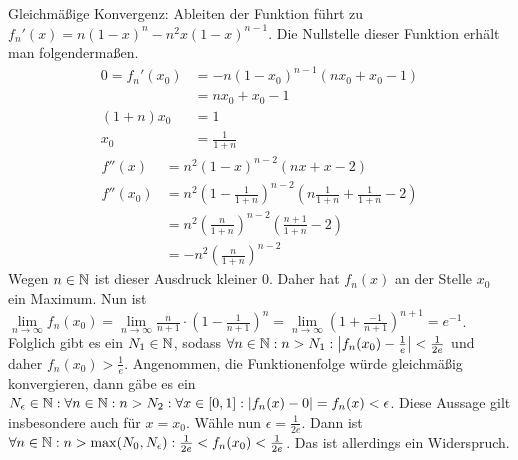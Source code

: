 \documentclass{article}
\begin{document}
\begin{enumerate}[(a)]
\begin{itemize}
            Gleichmäßige Konvergenz: Ableiten der Funktion führt zu $f_n'(x) = n(1-x)^n - n^2 x (1-x)^{n-1}$. Die Nullstelle dieser Funktion erhält man folgendermaßen.
            \begin{align*}
                0 = f_n'(x_0) &= -n(1-x_0)^{n-1}(nx_0 + x_0-1)\\
                &= nx_0 + x_0-1\\
                (1+n) x_0 &= 1\\
                x_0 &= \frac{1}{1+n}
            \end{align*}
            \begin{align*}
                f''(x) &= n^2 (1 - x)^{n - 2} (n x + x - 2)\\
                f''(x_0) &= n^2 (1 - \frac{1}{1+n})^{n - 2} (n \frac{1}{1+n} + \frac{1}{1+n} - 2)\\
                &= n^2 (\frac{n}{1+n})^{n - 2} ( \frac{n+1}{1+n}- 2)\\
                &= - n^2 (\frac{n}{1+n})^{n - 2}
            \end{align*}
            Wegen $n \in \mathbb{N}$ ist dieser Ausdruck kleiner 0. Daher hat $f_n(x)$ an der Stelle $x_0$ ein Maximum.
            Nun ist $\lim\limits_{n\to\infty}f_n(x_0) = \lim\limits_{n\to\infty} \frac{n}{n+1}\cdot \left(1 - \frac{1}{n+1}\right)^n = \lim\limits_{n\to\infty} \left(1 + \frac{-1}{n+1}\right)^{n+1} = e^{-1}$. Folglich gibt es ein $N_1 \in \mathbb{N}$, sodass $\forall n\in \mathbb{N}: n > N_1: \left|f_n(x_0) - \frac{1}{e}\right| < \frac{1}{2e}$ und daher $f_n(x_0) > \frac{1}{e}$. Angenommen, die Funktionenfolge würde gleichmäßig konvergieren, dann gäbe es ein $N_\epsilon \in \mathbb{N}: \forall n \in \mathbb{N}: n > N_2: \forall x \in [0,1]: |f_n(x) - 0| = f_n(x) < \epsilon$. Diese Aussage gilt insbesondere auch für $x = x_0$. Wähle nun $\epsilon = \frac{1}{2e}$. Dann ist $\forall n\in \mathbb{N}: n > \max(N_0, N_\epsilon): \frac{1}{2e} < f_n(x_0) < \frac{1}{2e}$. Das ist allerdings ein Widerspruch.
            \end{itemize} 
    \end{enumerate}
\end{document}
